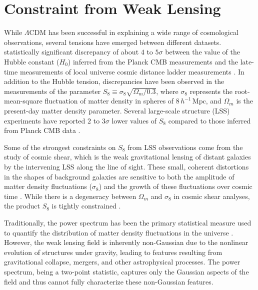 \section{Constraint from Weak Lensing}
While $\Lambda$CDM has been successful in explaining a wide range of cosmological observations, several tensions have emerged between different datasets. statistically significant discrepancy of about $4$ to $5\sigma$ between the value of the Hubble constant ($H_0$) inferred from the Planck CMB measurements \citep{2021CQGra..38o3001D} and the late-time measurements of local universe cosmic distance ladder measurements \citep{2022ApJ...934L...7R}. In addition to the Hubble tension, discrepancies have been observed in the measurements of the parameter $S_8 \equiv \sigma_8 \sqrt{\Omega_m/0.3}$, where $\sigma_8$ represents the root-mean-square fluctuation of matter density in spheres of $8\, h^{-1}\,\mathrm{Mpc}$, and $\Omega_m$ is the present-day matter density parameter. Several large-scale structure (LSS) experiments have reported $2$ to $3\sigma$ lower values of $S_8$ compared to those inferred from Planck CMB data \citep{2019PASJ...71...43H, 2021A&A...645A.104A, 2021JCAP...10..030G}.

Some of the strongest constraints on $S_8$ from LSS observations come from the study of cosmic shear, which is the weak gravitational lensing of distant galaxies by the intervening LSS along the line of sight. 
These small, coherent distortions in the shapes of background galaxies are sensitive to both the amplitude of matter density fluctuations ($\sigma_8$) and the growth of these fluctuations over cosmic time \citep{2001PhR...340..291B, 2010CQGra..27w3001B, 2015RPPh...78h6901K}. While there is a degeneracy between $\Omega_m$ and $\sigma_8$ in cosmic shear analyses, the product $S_8$ is tightly constrained \citep{2015RPPh...78h6901K, 2018ARA&A..56..393M}.

Traditionally, the power spectrum has been the primary statistical measure used to quantify the distribution of matter density fluctuations in the universe \citep{2019PASJ...71...43H, 2023PhRvD.108l3519D}. However, the weak lensing field is inherently non-Gaussian due to the nonlinear evolution of structures under gravity, leading to features resulting from gravitational collapse, mergers, and other astrophysical processes. The power spectrum, being a two-point statistic, captures only the Gaussian aspects of the field and thus cannot fully characterize these non-Gaussian features.

